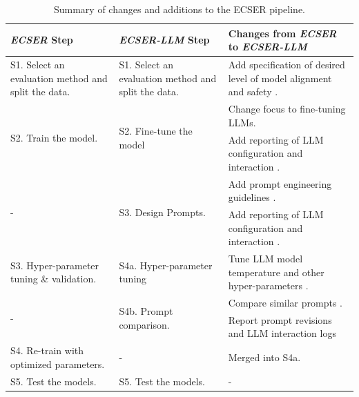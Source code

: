 \documentclass[a4paper]{article}
\newcommand{\newecser}{\textit{ECSER-LLM} }
\begin{document}
\begin{table}[H]
	\centering
	\caption{Summary of changes and additions to the ECSER pipeline.}
	\begin{tabularx}{\textwidth}{|p{3cm}|p{3.5cm}|X|}
		\hline
		\textbf{\textit{ECSER} Step} & \textbf{\newecser Step} & \textbf{Changes from \textit{ECSER} to \newecser} \\ \hline
		
		S1. Select an evaluation method and split the data.
		& S1. Select an evaluation method and split the data.
		& Add specification of desired level of model alignment and safety \cite{guo2023survey}. \\ \hline
		
		\multirow[c]{2}{*}{\parbox{3cm}{S2. Train the model.}}
		& \multirow[c]{2}{*}{\parbox{3.5cm}{S2. Fine-tune the model}} 
		& Change focus to fine-tuning LLMs. \\ 
		& & Add reporting of LLM configuration and interaction \cite{baltes2025guidelinesempiricalstudiessoftware}. \\ \hline
		
		\multirow[c]{2}{*}{\parbox{3cm}{-}}
		& \multirow[c]{2}{*}{\parbox{3.5cm}{S3. Design Prompts.}}
		& Add prompt engineering guidelines \cite{arvidsson2023,Marvin2024}.\\
		& & Add reporting of LLM configuration and interaction \cite{baltes2025guidelinesempiricalstudiessoftware}. \\ \hline
		
		\multirow[c]{1}{*}{\parbox{3cm}{S3. Hyper-parameter tuning \& validation.}}
		& \multirow[c]{1}{*}{\parbox{3.5cm}{S4a. Hyper-parameter tuning}}
		& Tune LLM model temperature and other hyper-parameters \cite{peeperkorn2024, baltes2025guidelinesempiricalstudiessoftware}. \\ \hline
		
		\multirow[c]{2}{*}{\parbox{3cm}{-}}
		& \multirow[c]{2}{*}{\parbox{3.5cm}{S4b. Prompt comparison.}}
		& Compare similar prompts \cite{sclar2024quantifyinglanguagemodelssensitivity,ronanki2023}. \\ 
		& & Report prompt revisions and LLM interaction logs \cite{baltes2025guidelinesempiricalstudiessoftware} \\ \hline
		
		S4. Re-train with optimized parameters. 
		& -
		& Merged into S4a.\\ \hline
		
		S5. Test the models.
		& S5. Test the models.
		& - \\ \hline
		

\end{tabularx}
\end{table}
\end{document}
